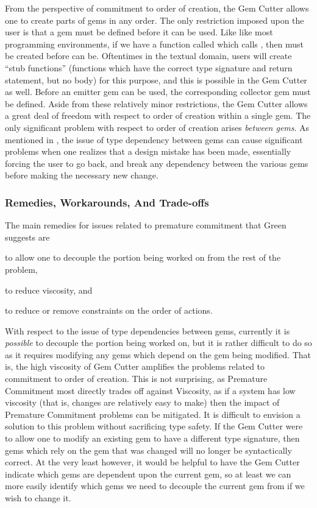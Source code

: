 From the perspective of commitment to order of creation, the Gem Cutter allows one to create parts of gems in any order.  The only restriction imposed upon the user is that a gem must be defined before it can be used.  Like like most programming environments, if we have a function called  which calls , then  must be created before  can be.  Oftentimes in the textual domain, users will create ``stub functions'' (functions which have the correct type signature and return statement, but no body) for this purpose, and this is possible in the Gem Cutter as well.  Before an emitter gem can be used, the corresponding collector gem must be defined.  Aside from these relatively minor restrictions, the Gem Cutter allows a great deal of freedom with respect to order of creation within a single gem.  The only significant problem with respect to order of creation arises \emph{between gems}.  As mentioned in , the issue of type dependency between gems can cause significant problems when one realizes that a design mistake has been made, essentially forcing the user to go back, and break any dependency between the various gems before making the necessary new change.

\subsubsection{Remedies, Workarounds, And Trade-offs}

The main remedies for issues related to premature commitment that Green suggests are \begin{inparaenum}[(a)]
\item to allow one to decouple the portion being worked on from the rest of the problem,
\item to reduce viscosity, and
\item to reduce or remove constraints on the order of actions.
\end{inparaenum} 

With respect to the issue of type dependencies between gems, currently it is \emph{possible} to decouple the portion being worked on, but it is rather difficult to do so as it requires modifying any gems which depend on the gem being modified.  That is, the high viscosity of Gem Cutter amplifies the problems related to commitment to order of creation.  This is not surprising, as Premature Commitment most directly trades off against Viscosity, as if a system has low viscosity (that is, changes are relatively easy to make) then the impact of Premature Commitment problems can be mitigated.  It is difficult to envision a solution to this problem without sacrificing type safety.  If the Gem Cutter were to allow one to modify an existing gem to have a different type signature, then gems which rely on the gem that was changed will no longer be syntactically correct.  At the very least however, it would be helpful to have the Gem Cutter indicate which gems are dependent upon the current gem, so at least we can more easily identify which gems we need to decouple the current gem from if we wish to change it.


